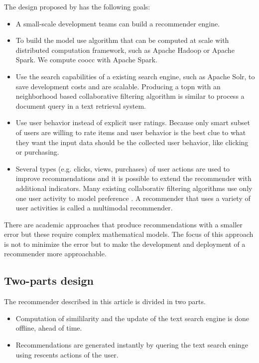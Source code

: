 The design proposed by \cite{Dunning14} has the following goals:
\begin{itemize}
\item A small-scale development teams can build a recommender engine.
\item To build the model use algorithm that can be computed at scale with distributed computation framework, such as Apache Hadoop or Apache Spark. We compute \gls{coocc} with Apache Spark.
\item Use the search capabilities of a existing search engine, such as Apache Solr, to save development costs and are \gls{scalable}. Producing a \gls{topn} with an neighborhood based collaborative filtering algorithm is similar to process a document query in a text retrieval system. 
\item Use user behavior instead of explicit user ratings. Because only smart subset of users are willing to rate items and user behavior is the best clue to what they want the input data should be the collected user behavior, like clicking or purchasing.
\item Several types (e.g. clicks, views, purchases) of user actions are used to improve recommendations and it is possible to extend the recommender with additional \glspl{indicator}. Many existing collaborativ filtering algorithms use only one user activity to model preference \cite{ferrel}.  A recommender that uses a variety of user activities is called a \gls{multimodal} recommender. 
\end{itemize}

There are academic approaches that produce recommendations with a smaller error but these require complex mathematical models. The focus of this approach is not to minimize the error but to make the development and deployment of a recommender more approachable.

\subsection{Two-parts design}

The recommender described in this article is divided in two parts.
\begin{itemize}
\item Computation of simililarity and the update of the text search engine is done offline, ahead of time.
\item Recommendations are generated instantly by quering the text search eninge using rescents actions of the user.


\end{itemize}

